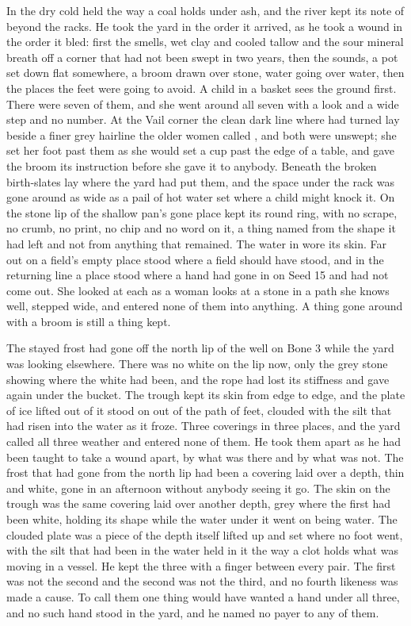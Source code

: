 In  the dry cold held the way a coal holds under ash, and the river kept its note of  beyond the racks. He took the yard in the order it arrived, as he took a wound in the order it bled: first the smells, wet clay and cooled tallow and the sour mineral breath off a corner that had not been swept in two years, then the sounds, a pot set down flat somewhere, a broom drawn over stone, water going over water, then the places the feet were going to avoid. A child in a basket sees the ground first. There were seven of them, and she went around all seven with a look and a wide step and no number. At the Vail corner the clean dark line where  had turned lay beside a finer grey hairline the older women called , and both were unswept; she set her foot past them as she would set a cup past the edge of a table, and gave the broom its instruction before she gave it to anybody. Beneath  the broken birth-slates lay where the yard had put them, and the space under the rack was gone around as wide as a pail of hot water set where a child might knock it. On the stone lip of  the shallow pan's gone place kept its round ring, with no scrape, no crumb, no print, no chip and no word on it, a thing named from the shape it had left and not from anything that remained. The water in  wore its skin. Far out on  a field's empty place stood where a field should have stood, and in the returning line a place stood where a hand had gone in on Seed 15 and had not come out. She looked at each as a woman looks at a stone in a path she knows well, stepped wide, and entered none of them into anything. A thing gone around with a broom is still a thing kept.

The stayed frost had gone off the north lip of the well on Bone 3 while the yard was looking elsewhere. There was no white on the lip now, only the grey stone showing where the white had been, and the rope had lost its stiffness and gave again under the bucket. The trough kept its skin from edge to edge, and the plate of ice lifted out of it stood on  out of the path of feet, clouded with the silt that had risen into the water as it froze. Three coverings in three places, and the yard called all three weather and entered none of them. He took them apart as he had been taught to take a wound apart, by what was there and by what was not. The frost that had gone from the north lip had been a covering laid over a depth, thin and white, gone in an afternoon without anybody seeing it go. The skin on the trough was the same covering laid over another depth, grey where the first had been white, holding its shape while the water under it went on being water. The clouded plate was a piece of the depth itself lifted up and set where no foot went, with the silt that had been in the water held in it the way a clot holds what was moving in a vessel. He kept the three with a finger between every pair. The first was not the second and the second was not the third, and no fourth likeness was made a cause. To call them one thing would have wanted a hand under all three, and no such hand stood in the yard, and he named no payer to any of them.

